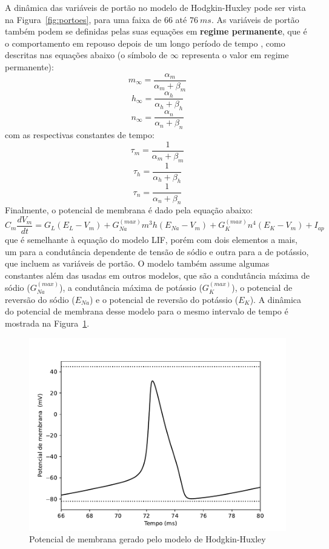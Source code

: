 A dinâmica das variáveis de portão no modelo de Hodgkin-Huxley pode ser vista na Figura~\ref{fig:portoes}, para uma faixa de 66 até $76\ ms$. As variáveis de portão também podem se definidas pelas suas equações em \textbf{regime permanente}, que é o comportamento em repouso depois de um longo período de tempo \cite{ermentrout_mathematical_2010}, como descritas nas equações abaixo (o símbolo de $\infty$ representa o valor em regime permanente):
\begin{equation}\label{eq:m_inf}
	m_\infty=\frac{\alpha_m}{\alpha_m+\beta_m}
\end{equation}
\begin{equation}\label{eq:h_inf}
	h_\infty=\frac{\alpha_h}{\alpha_h+\beta_h}
\end{equation}
\begin{equation}\label{eq:n_inf}
	n_\infty=\frac{\alpha_n}{\alpha_n+\beta_n}
\end{equation}
com as respectivas constantes de tempo:
\begin{equation}\label{eq:tau_m}
	\tau_m=\frac{1}{\alpha_m+\beta_m}
\end{equation}
\begin{equation}\label{eq:tau_n}
	\tau_h=\frac{1}{\alpha_h+\beta_h}
\end{equation}
\begin{equation}\label{eq:tau_h}
	\tau_n=\frac{1}{\alpha_n+\beta_n}
\end{equation}
Finalmente, o potencial de membrana é dado pela equação abaixo:
\begin{equation}\label{eq:hodgkin_huxley}
	C_m\frac{dV_m}{dt}=G_L(E_L-V_m)+G_{Na}^{(max)}m^3h(E_{Na}-V_m)+G_K^{(max)}n^4(E_K-V_m)+I_{ap}
\end{equation}
que é semelhante à equação do modelo LIF, porém com dois elementos a mais, um para a condutância dependente de tensão de sódio e outra para a de potássio, que incluem as variáveis de portão. O modelo também assume algumas constantes além das usadas em outros modelos, que são a condutância máxima de sódio ($G_{Na}^{(max)}$), a condutância máxima de potássio ($G_K^{(max)}$), o potencial de reversão do sódio ($E_{Na}$) e o potencial de reversão do potássio ($E_K$). A dinâmica do potencial de membrana desse modelo para o mesmo intervalo de tempo é mostrada na Figura~\ref{fig:hhvm}.

\begin{figure}[tb]
	\centering
	\caption{Potencial de membrana gerado pelo modelo de Hodgkin-Huxley}
	\label{fig:hhvm}
	\includegraphics[width=0.7\linewidth]{figs/hh_vm}
\end{figure}
